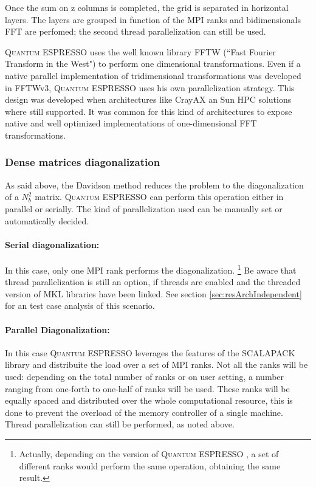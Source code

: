 \documentclass[a4paper,12pt]{article}
\newcommand\QE{\textsc{Quantum} ESPRESSO }
\begin{document}
Once the sum on z columns is completed, the grid is separated in horizontal layers. 
The layers are grouped in function of the MPI ranks and bidimensionals FFT are perfomed; the second thread parallelization can still be used.

\QE uses the well known library FFTW (``Fast Fourier Transform in the West")\cite{FFTW} to perform one dimensional transformations. 
Even if a native parallel implementation of tridimensional transformations was developed in FFTWv3, \QE uses his own parallelization strategy. 
This design was developed when architectures like CrayAX an Sun HPC solutions where still supported. It was common for this kind of architectures to expose native and well optimized implementations of one-dimensional FFT transformations.

\subsubsection{Dense matrices diagonalization}

As said above, the Davidson method reduces the problem to the diagonalization of a $N_{b}^2$ matrix.
\QE can perform this operation either in parallel or serially.
The kind of parallelization used can be manually set or automatically decided.

\paragraph{Serial diagonalization: }  In this case, only one MPI rank performs the diagonalization.
\footnote{Actually, depending on the version of \QE, a set of different ranks would perform the same operation, obtaining the same result.}
Be aware that thread parallelization is still an option, if threads are enabled and the threaded version of MKL libraries have been linked.
See section \ref{sec:resArchIndependent} for an test case analysis of this scenario.

\paragraph{Parallel Diagonalization: } In this case \QE leverages the features of the SCALAPACK library and distribuite the load over a set of MPI ranks. 
Not all the ranks will be used: depending on the total number of ranks or on user setting, a number ranging from one-forth to one-half of ranks will be used. 
These ranks will be equally spaced and distributed over the whole computational resource, this is done to prevent the overload of the memory controller of a single machine.
Thread parallelization can still be performed, as noted above.
\end{document}
